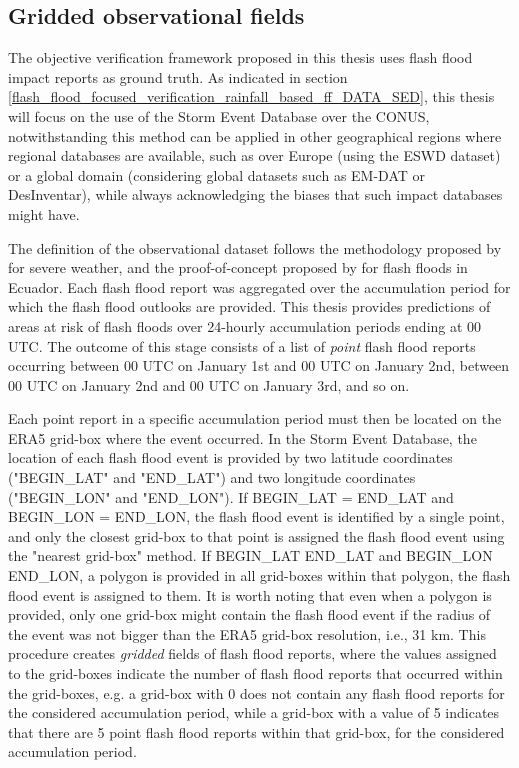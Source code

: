 \subsection{Gridded observational fields}
The objective verification framework proposed in this thesis uses flash flood impact reports as ground truth. As indicated in section \ref{flash_flood_focused_verification_rainfall_based_ff_DATA_SED}, this thesis will focus on the use of the Storm Event Database over the CONUS, notwithstanding this method can be applied in other geographical regions where regional databases are available, such as over Europe (using the ESWD dataset) or a global domain (considering global datasets such as EM-DAT or DesInventar), while always acknowledging the biases that such impact databases might have. 

The definition of the observational dataset follows the methodology proposed by \citet{Tsonevsky_2018} for severe weather, and the proof-of-concept proposed by \citet{Pillosu_2024} for flash floods in Ecuador. Each flash flood report was aggregated over the accumulation period for which the flash flood outlooks are provided. This thesis provides predictions of areas at risk of flash floods over 24-hourly accumulation periods ending at 00 UTC. The outcome of this stage consists of a list of \textit{point} flash flood reports occurring between 00 UTC on January 1st and 00 UTC on January 2nd, between 00 UTC on January 2nd and 00 UTC on January 3rd, and so on. 

Each point report in a specific accumulation period must then be located on the ERA5 grid-box where the event occurred. In the Storm Event Database, the location of each flash flood event is provided by two latitude coordinates ("BEGIN\_LAT" and "END\_LAT") and two longitude coordinates ("BEGIN\_LON" and "END\_LON"). If BEGIN\_LAT = END\_LAT and BEGIN\_LON = END\_LON, the flash flood event is identified by a single point, and only the closest grid-box to that point is assigned the flash flood event using the "nearest grid-box" method. If BEGIN\_LAT \ne END\_LAT and BEGIN\_LON \ne END\_LON, a polygon is provided in all grid-boxes within that polygon, the flash flood event is assigned to them. It is worth noting that even when a polygon is provided, only one grid-box might contain the flash flood event if the radius of the event was not bigger than the ERA5 grid-box resolution, i.e., 31 km. This procedure creates \textit{gridded} fields of flash flood reports, where the values assigned to the grid-boxes indicate the number of flash flood reports that occurred within the grid-boxes, e.g. a grid-box with 0 does not contain any flash flood reports for the considered accumulation period, while a grid-box with a value of 5 indicates that there are 5 point flash flood reports within that grid-box, for the considered accumulation period.

